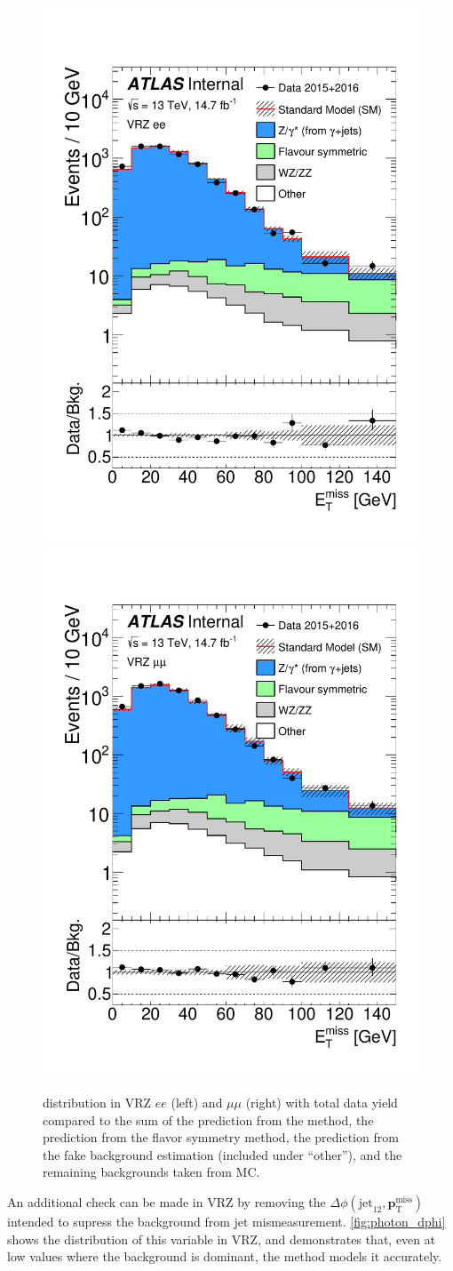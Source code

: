 \begin{centering}
\begin{figure}[!hbt]
\myfloatalign
\includegraphics[width=.45\linewidth]{figures/photons/MET_azmet_ee_onz.pdf}
\includegraphics[width=.45\linewidth]{figures/photons/MET_azmet_mm_onz.pdf}
\caption{\MET distribution in VRZ $ee$ (left) and $\mu\mu$ (right) with total data yield compared to the sum of the prediction from the \gjets method, the prediction from the flavor symmetry method, the prediction from the fake background estimation (included under ``other''), and the remaining backgrounds taken from \ac{MC}.}
\label{fig:photon_validation}
\end{figure}
\end{centering}

An additional check can be made in VRZ by removing the $\Delta\phi(\text{jet}_{12},{\boldsymbol p}_{\mathrm{T}}^\mathrm{miss})$ intended to supress the \dyjets background from jet mismeasurement. \autoref{fig:photon_dphi} shows the distribution of this variable in VRZ, and demonstrates that, even at low values where the \dyjets background is dominant, the \gjets method models it accurately.

